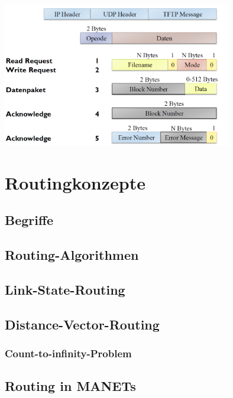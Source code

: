 \documentclass{article} %
\begin{document}
	\begin{center}
		\includegraphics[width=10cm]{img/tftp.png}
	\end{center}
	
	

\section{Routingkonzepte}


\subsection{Begriffe}

\subsection{Routing-Algorithmen}

\subsection{Link-State-Routing}

\subsection{Distance-Vector-Routing}

\subsubsection{Count-to-infinity-Problem}

\subsection{Routing in MANETs}
\end{document}
